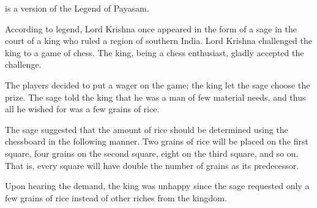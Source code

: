 \investigation*{}
\begin{problem}
 is a version of the Legend of Payasam. 

According to legend, Lord Krishna once appeared in the form of a sage in the court of a 
king who ruled a region of southern India. Lord Krishna challenged the king to a game of chess. 
The king, being a chess 
enthusiast, gladly accepted the challenge.

The players decided to put a wager on the game; the king let the sage choose the prize.
The sage told the 
king that he was a man of few material needs, and thus all he wished for was a few grains of rice. 

The sage suggested that the amount of rice should be determined 
using the chessboard in the following manner. 
Two grains of rice will be placed on the first square, four grains on the second square, eight 
on the third square, and so on. That is, every square will have double the 
number of grains as its predecessor.

Upon hearing the demand, the king was unhappy since the sage requested only a few grains of 
rice instead of other riches from the kingdom.


\end{problem}
